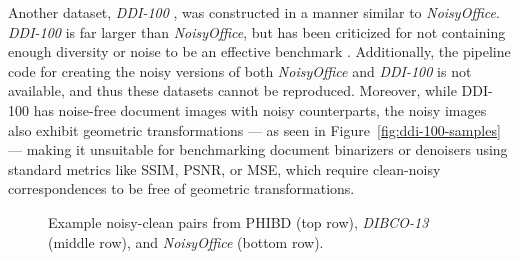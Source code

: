 \documentclass[runningheads]{llncs}
\begin{document}
Another dataset, \emph{DDI-100} \cite{ddi-100-2019}, was constructed in a manner similar to \emph{NoisyOffice}.
\emph{DDI-100} is far larger than \emph{NoisyOffice}, but has been criticized for not containing enough diversity or noise to be an effective benchmark \cite{detection-masking-2022}.
Additionally, the pipeline code for creating the noisy versions of both \emph{NoisyOffice} and \emph{DDI-100} is not available, and thus these datasets cannot be reproduced.
Moreover, while DDI-100 has noise-free document images with noisy counterparts, the noisy images also exhibit geometric transformations --- as seen in Figure~\ref{fig:ddi-100-samples} --- making it unsuitable for benchmarking document binarizers or denoisers using standard metrics like SSIM, PSNR, or MSE, which require clean-noisy correspondences to be free of geometric transformations.

\begin{figure}
    \centering{}
    \caption{Example noisy-clean pairs from PHIBD (top row), \emph{DIBCO-13} (middle row), and \emph{NoisyOffice} (bottom row).}
    \label{fig:other-dataset-examples}
\end{figure}
\end{document}
